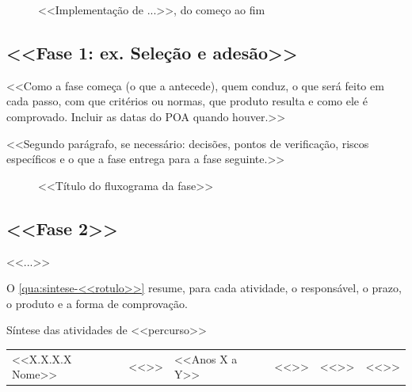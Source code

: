 \begin{figure}[htbp]
  \centering
  \caption{<<Implementação de ...>>, do começo ao fim}
  \label{fig:<<rotulo>>}
\end{figure}

\subsection{<<Fase 1: ex. Seleção e adesão>>}
\label{subsec:<<rotulo-fase1>>}

<<Como a fase começa (o que a antecede), quem conduz, o que será feito em
cada passo, com que critérios ou normas, que produto resulta e como ele é
comprovado. Incluir as datas do POA quando houver.>>

<<Segundo parágrafo, se necessário: decisões, pontos de verificação,
riscos específicos e o que a fase entrega para a fase seguinte.>>

\begin{figure}[htbp]
  \centering
  \caption{<<Título do fluxograma da fase>>}
  \label{fig:<<rotulo-fase1>>}
\end{figure}

\subsection{<<Fase 2>>}
\label{subsec:<<rotulo-fase2>>}

<<...>>

O \autoref{qua:sintese-<<rotulo>>} resume, para cada atividade, o
responsável, o prazo, o produto e a forma de comprovação.

\begin{quadro}[htbp]
\caption{Síntese das atividades de <<percurso>>}
\label{qua:sintese-<<rotulo>>}
\footnotesize
\renewcommand{\arraystretch}{1.25}
\begin{tabularx}{\textwidth}{|P{2.9cm}|P{2.0cm}|Q{1.3cm}|L|L|P{1.4cm}|}
\hline
{} &  &  &  &
 &  \\ \hline
<<X.X.X.X Nome>> & <<>> & <<Anos X a Y>> & <<>> & <<>> & <<>> \\ \hline
\end{tabularx}
\end{quadro}
